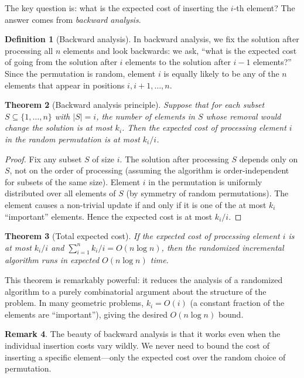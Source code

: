 \documentclass[twoside,12pt]{book}
\theoremstyle{plain}
\newtheorem{theorem}{Theorem}[chapter]
\theoremstyle{definition}
\newtheorem{definition}[theorem]{Definition}
\newtheorem{remark}[theorem]{Remark}
\theoremstyle{remark}
\begin{document}
The key question is: what is the expected cost of inserting the $i$-th element? The answer comes from \emph{backward analysis}.

\begin{definition}[Backward analysis]
In backward analysis, we fix the solution after processing all $n$ elements and look backwards: we ask, ``what is the expected cost of going from the solution after $i$ elements to the solution after $i-1$ elements?'' Since the permutation is random, element $i$ is equally likely to be any of the $n$ elements that appear in positions $i, i+1, \ldots, n$.
\end{definition}

\begin{theorem}[Backward analysis principle]
\label{thm:backward}
Suppose that for each subset $S \subseteq \{1, \ldots, n\}$ with $|S| = i$, the number of elements in $S$ whose removal would change the solution is at most $k_i$. Then the expected cost of processing element $i$ in the random permutation is at most $k_i / i$.
\end{theorem}

\begin{proof}
Fix any subset $S$ of size $i$. The solution after processing $S$ depends only on $S$, not on the order of processing (assuming the algorithm is order-independent for subsets of the same size). Element $i$ in the permutation is uniformly distributed over all elements of $S$ (by symmetry of random permutations). The element causes a non-trivial update if and only if it is one of the at most $k_i$ ``important'' elements. Hence the expected cost is at most $k_i / i$.
\end{proof}

\begin{theorem}[Total expected cost]
\label{thm:ric-total}
If the expected cost of processing element $i$ is at most $k_i / i$ and $\sum_{i=1}^{n} k_i / i = O(n \log n)$, then the randomized incremental algorithm runs in expected $O(n \log n)$ time.
\end{theorem}

This theorem is remarkably powerful: it reduces the analysis of a randomized algorithm to a purely combinatorial argument about the structure of the problem. In many geometric problems, $k_i = O(i)$ (a constant fraction of the elements are ``important''), giving the desired $O(n \log n)$ bound.

\begin{remark}
The beauty of backward analysis is that it works even when the individual insertion costs vary wildly. We never need to bound the cost of inserting a specific element---only the expected cost over the random choice of permutation.
\end{remark}
\end{document}
